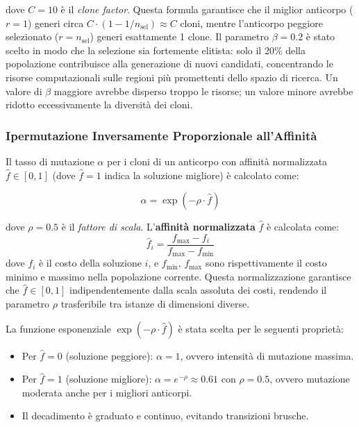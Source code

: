 \documentclass[a4paper,12pt]{article}
\begin{document}
dove $C = 10$ è il \emph{clone factor}. Questa formula garantisce che il miglior anticorpo ($r=1$) generi circa $C \cdot (1 - 1/n_{\text{sel}}) \approx C$ cloni, mentre l'anticorpo peggiore selezionato ($r = n_{\text{sel}}$) generi esattamente 1 clone. Il parametro $\beta = 0.2$ è stato scelto in modo che la selezione sia fortemente elitista: solo il 20\% della popolazione contribuisce alla generazione di nuovi candidati, concentrando le risorse computazionali sulle regioni più promettenti dello spazio di ricerca. Un valore di $\beta$ maggiore avrebbe disperso troppo le risorse; un valore minore avrebbe ridotto eccessivamente la diversità dei cloni.

\subsubsection{Ipermutazione Inversamente Proporzionale all'Affinità}

Il tasso di mutazione $\alpha$ per i cloni di un anticorpo con affinità normalizzata $\hat{f} \in [0, 1]$ (dove $\hat{f} = 1$ indica la soluzione migliore) è calcolato come:

\begin{equation}
    \alpha = \exp(-\rho \cdot \hat{f})
    \label{eq:alpha}
\end{equation}

dove $\rho = 0.5$ è il \emph{fattore di scala}. L'\textbf{affinità normalizzata} $\hat{f}$ è calcolata come:
\begin{equation}
    \hat{f}_i = \frac{f_{\max} - f_i}{f_{\max} - f_{\min}}
\end{equation}
dove $f_i$ è il costo della soluzione $i$, e $f_{\min}$, $f_{\max}$ sono rispettivamente il costo minimo e massimo nella popolazione corrente. Questa normalizzazione garantisce che $\hat{f} \in [0, 1]$ indipendentemente dalla scala assoluta dei costi, rendendo il parametro $\rho$ trasferibile tra istanze di dimensioni diverse.

La funzione esponenziale $\exp(-\rho \cdot \hat{f})$ è stata scelta per le seguenti proprietà:
\begin{itemize}
    \item Per $\hat{f} = 0$ (soluzione peggiore): $\alpha = 1$, ovvero intensità di mutazione massima.
    \item Per $\hat{f} = 1$ (soluzione migliore): $\alpha = e^{-\rho} \approx 0.61$ con $\rho = 0.5$, ovvero mutazione moderata anche per i migliori anticorpi.
    \item Il decadimento è graduato e continuo, evitando transizioni brusche.
\end{itemize}
\end{document}

